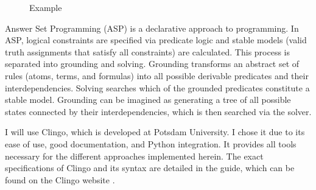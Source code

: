 \documentclass{llncs}
\begin{document}
\begin{multicols*}{2}
\begin{figure}[t]
\begin{minipage}[b]{0.26\textwidth}
{
        }
        \caption{Example}
        \label{fig:example}
    \end{minipage}
    \begin{minipage}[b]{0.72\textwidth}
        
    \end{minipage}
\end{figure}

Answer Set Programming (ASP) is a declarative approach to programming. In ASP, logical constraints are specified via predicate logic and stable models (valid truth assignments that satisfy all constraints) are calculated.
This process is separated into grounding and solving. Grounding transforms an abstract set of rules (atoms, terms, and formulas) into all possible derivable predicates and their interdependencies. Solving searches which of the grounded predicates constitute a stable model. Grounding can be imagined as generating a tree of all possible states connected by their interdependencies, which is then searched via the solver.

I will use Clingo, which is developed at Potsdam University. I chose it due to its ease of use, good documentation, and Python integration. It provides all tools necessary for the different approaches implemented herein. The exact specifications of Clingo and its syntax are detailed in the guide, which can be found on the Clingo website \cite{Clin24}.\\


\end{multicols*}
\end{document}
